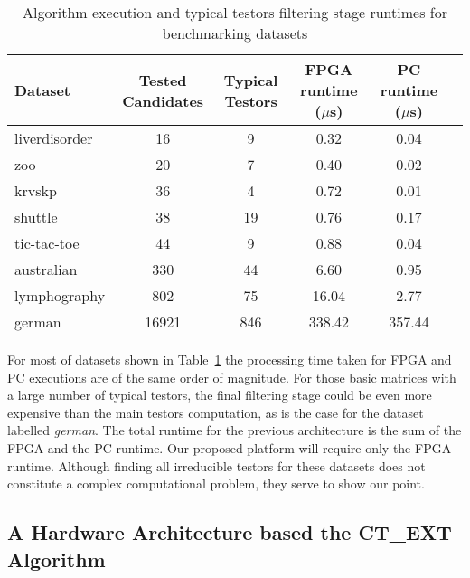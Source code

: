 \documentclass[authoryear,11pt]{elsarticle}
\begin{document}
	\begin{table}[htb]
	\caption{Algorithm execution and typical testors filtering stage runtimes for benchmarking datasets}
	\label{tabTimes}
	\centering
	\begin{tabular}{lccccc}
	 	\hline                       
	  	Dataset & Tested Candidates & Typical Testors & FPGA runtime ($ \mu $s) & PC runtime ($ \mu $s)\\
	  	\hline
	  	liverdisorder& 16   & 9    & 0.32  & 0.04 \\
	  	zoo          & 20   & 7    & 0.40  & 0.02 \\
	  	krvskp       & 36   & 4    & 0.72  & 0.01 \\	  	
	  	shuttle      & 38   & 19   & 0.76  & 0.17 \\
	  	tic-tac-toe  & 44   & 9    & 0.88  & 0.04 \\
	  	australian   & 330  & 44   & 6.60  & 0.95 \\
	  	lymphography & 802  & 75   & 16.04 & 2.77 \\
	  	german       & 16921& 846  & 338.42& 357.44 \\
	 	\hline 
	\end{tabular}
	\end{table}
	
	For most of datasets shown in Table~\ref{tabTimes} the processing time taken for FPGA and PC executions are 
	of the same order of magnitude. For those basic matrices with a large number of typical testors, the final 
	filtering stage could be  even more expensive than the main testors computation, as is the case for the dataset 
	labelled \textit{german}. The total runtime for the previous architecture is the sum of the FPGA and the 
	PC runtime. Our proposed platform will require only the FPGA runtime. Although finding all irreducible testors 
	for these datasets does not constitute a complex computational problem, they serve to show our point.

\subsection{A Hardware Architecture based the CT\_EXT Algorithm}\label{CTH}

\newpage 
{}

\end{document}

